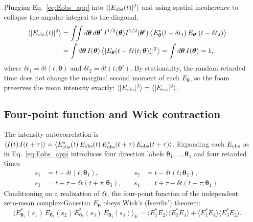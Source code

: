\documentclass[aps,prd,onecolumn,amsmath,amssymb]{revtex4-2}
\begin{document}
Plugging Eq.~\eqref{eq:Eobs_app} into $\langle|E_{\rm obs}(t)|^2\rangle$
and using spatial incoherence to collapse the angular integral to the
diagonal,
\begin{align}
  \langle |E_{\rm obs}(t)|^2 \rangle
  &= \int\!\!\int d\boldsymbol{\theta}\,d\boldsymbol{\theta}'\,
    I^{1/2}(\boldsymbol{\theta})I^{1/2}(\boldsymbol{\theta}')\,
    \big\langle E^*_{\boldsymbol{\theta}}(t-\delta t_{1})\,
                E_{\boldsymbol{\theta}'}(t-\delta t_{2})\big\rangle \notag\\
  &= \int d\boldsymbol{\theta}\, I(\boldsymbol{\theta})\,
    \big\langle |E_{\boldsymbol{\theta}}(t-\delta t(t;\boldsymbol{\theta}))|^2 \big\rangle
    = \int d\boldsymbol{\theta}\, I(\boldsymbol{\theta}) = 1,
\end{align}
where $\delta t_1 = \delta t(t;\boldsymbol{\theta})$ and
$\delta t_2 = \delta t(t;\boldsymbol{\theta}')$.  By stationarity, the
random retarded time does not change the marginal second moment of each
$E_{\boldsymbol{\theta}}$, so the foam preserves the mean intensity
exactly: $\langle |E_{\rm obs}|^2 \rangle = \langle |E_{\rm src}|^2\rangle$.

\subsection{Four-point function and Wick contraction}

The intensity autocorrelation is
$\langle I(t)\,I(t+\tau)\rangle = \langle E^*_{\rm obs}(t)\,E_{\rm obs}(t)\,
E^*_{\rm obs}(t+\tau)\,E_{\rm obs}(t+\tau)\rangle$.  Expanding each
$E_{\rm obs}$ as in Eq.~\eqref{eq:Eobs_app} introduces four direction
labels $\boldsymbol{\theta}_1,\ldots,\boldsymbol{\theta}_4$ and four
retarded times
\begin{equation}
\begin{aligned}
  s_1 &= t - \delta t(t;\boldsymbol{\theta}_1), &\quad
  s_2 &= t - \delta t(t;\boldsymbol{\theta}_2), \\
  s_3 &= t+\tau - \delta t(t+\tau;\boldsymbol{\theta}_3), &\quad
  s_4 &= t+\tau - \delta t(t+\tau;\boldsymbol{\theta}_4).
\end{aligned}
\end{equation}
Conditioning on a realization of $\delta t$, the four-point function of
the independent zero-mean complex-Gaussian $E_{\boldsymbol{\theta}}$
obeys Wick's (Isserlis') theorem:
\begin{equation}
  \langle E^*_{\boldsymbol{\theta}_1}(s_1)\,E_{\boldsymbol{\theta}_2}(s_2)\,
    E^*_{\boldsymbol{\theta}_3}(s_3)\,E_{\boldsymbol{\theta}_4}(s_4)\rangle_{E}
  = \langle E^*_1 E_2\rangle\langle E^*_3 E_4\rangle
  + \langle E^*_1 E_4\rangle\langle E^*_3 E_2\rangle.
  \label{eq:Wick_app}
\end{equation}
\end{document}
